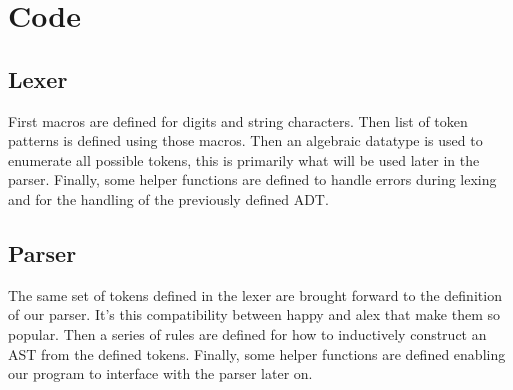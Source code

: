 \documentclass[12pt,a4paper]{report}
\theoremstyle{definition}
\theoremstyle{remark}
\begin{document}
\chapter{Code}

\section{Lexer}\label{appendix: lexer}
First macros are defined for digits and string characters. Then list of token patterns is defined using those macros. Then an algebraic datatype is used to enumerate all possible tokens, this is primarily what will be used later in the parser. Finally, some helper functions are defined to handle errors during lexing and for the handling of the previously defined ADT.



\section{Parser}\label{appendix: parser}
The same set of tokens defined in the lexer are brought forward to the definition of our parser. It's this compatibility between happy and alex that make them so popular. Then a series of rules are defined for how to inductively construct an AST from the defined tokens. Finally, some helper functions are defined enabling our program to interface with the parser later on. 




%
\end{document}
